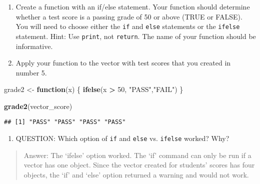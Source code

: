\documentclass[]{article}
\newenvironment{Shaded}{\begin{snugshade}}{\end{snugshade}}
\newcommand{\ControlFlowTok}[1]{\textcolor[rgb]{0.13,0.29,0.53}{\textbf{#1}}}
\newcommand{\DecValTok}[1]{\textcolor[rgb]{0.00,0.00,0.81}{#1}}
\newcommand{\KeywordTok}[1]{\textcolor[rgb]{0.13,0.29,0.53}{\textbf{#1}}}
\newcommand{\NormalTok}[1]{#1}
\newcommand{\OperatorTok}[1]{\textcolor[rgb]{0.81,0.36,0.00}{\textbf{#1}}}
\newcommand{\StringTok}[1]{\textcolor[rgb]{0.31,0.60,0.02}{#1}}
\providecommand{\tightlist}{%
  \setlength{\itemsep}{0pt}\setlength{\parskip}{0pt}}
\begin{document}
\begin{enumerate}
\def\labelenumi{\arabic{enumi}.}
\setcounter{enumi}{9}
\item
  Create a function with an if/else statement. Your function should
  determine whether a test score is a passing grade of 50 or above (TRUE
  or FALSE). You will need to choose either the \texttt{if} and
  \texttt{else} statements or the \texttt{ifelse} statement. Hint: Use
  \texttt{print}, not \texttt{return}. The name of your function should
  be informative.
\item
  Apply your function to the vector with test scores that you created in
  number 5.
\end{enumerate}

\begin{Shaded}
\begin{Highlighting}[]
\NormalTok{grade2 <-}\StringTok{ }\ControlFlowTok{function}\NormalTok{(x) \{}
  \KeywordTok{ifelse}\NormalTok{(x }\OperatorTok{>}\StringTok{ }\DecValTok{50}\NormalTok{, }\StringTok{"PASS"}\NormalTok{,}\StringTok{"FAIL"}\NormalTok{) \}}

\KeywordTok{grade2}\NormalTok{(vector_score)}
\end{Highlighting}
\end{Shaded}

\begin{verbatim}
## [1] "PASS" "PASS" "PASS" "PASS"
\end{verbatim}

\begin{enumerate}
\def\labelenumi{\arabic{enumi}.}
\setcounter{enumi}{11}
\tightlist
\item
  QUESTION: Which option of \texttt{if} and \texttt{else} vs.
  \texttt{ifelse} worked? Why?
\end{enumerate}

\begin{quote}
Answer: The `ifelse' option worked. The `if' command can only be run if
a vector has one object. Since the vector created for students' scores
has four objects, the `if' and `else' option returned a warning and
would not work.
\end{quote}
\end{document}
